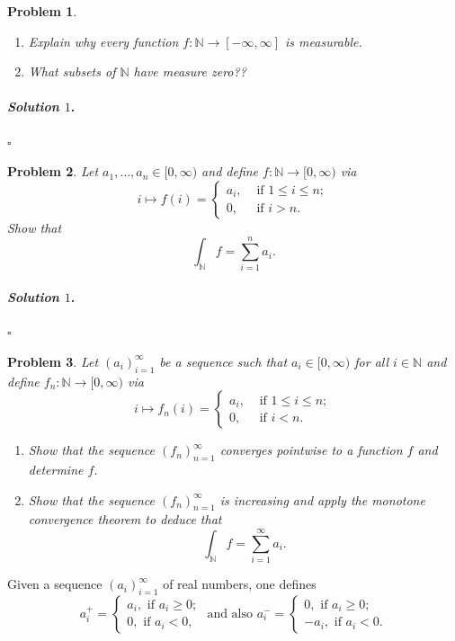 \documentclass[reqno]{amsart}
\theoremstyle{plain}
\newtheorem{problem}{Problem}
\theoremstyle{definition}
\newenvironment{solution1}{\paragraph{\emph{Solution $1$}.}}{\hfill$\square$}
\begin{document}
\begin{problem}
\hfill
\begin{enumerate}
\item Explain why every function $f:\mathbb{N} \rightarrow [-\infty,\infty]$ is measurable.
\item What subsets of $\mathbb{N}$ have measure zero??
\end{enumerate}
\end{problem}
\begin{solution1}

\end{solution1}

\begin{problem}
Let $a_{1},\ldots,a_{n} \in [0,\infty)$ and define $f:\mathbb{N} \rightarrow [0,\infty)$ via
$$i \mapsto f(i) = \begin{cases} a_{i}, &\text{ if } 1 \le i \le n;\\ 0, &\text{ if } i > n.  \end{cases} $$
Show that
$$\int_{\mathbb{N}}f = \sum_{i=1}^{n}a_{i}. $$
\end{problem}
\begin{solution1}

\end{solution1}

\begin{problem}
Let $(a_{i})_{i=1}^{\infty}$ be a sequence such that $a_{i} \in [0,\infty)$ for all $i \in \mathbb{N}$ and define $f_{n}:\mathbb{N} \rightarrow [0,\infty)$ via
$$i \mapsto f_{n}(i) = \begin{cases} a_{i}, & \text{ if } 1 \le i \le n;\\0, & \text{ if } i < n. \end{cases} $$
\begin{enumerate}
\item Show that the sequence $(f_{n})_{n=1}^{\infty}$ converges pointwise to a function $f$ and determine $f$.
\item Show that the sequence $(f_{n})_{n=1}^{\infty}$ is increasing and apply the monotone convergence theorem to deduce that
$$\int_{\mathbb{N}} f = \sum_{i=1}^{\infty}a_{i}. $$
\end{enumerate}
\end{problem}

Given a sequence $(a_{i})_{i=1}^{\infty}$ of real numbers, one defines
$$a_{i}^{+} = \begin{cases} a_{i}, \text{ if } a_{i} \ge 0; \\ 0, \text{ if } a_{i} < 0, \end{cases} \text{ and also } a_{i}^{-} = \begin{cases} 0, \text{ if } a_{i} \ge 0; \\ -a_{i}, \text{ if } a_{i} < 0. \end{cases} $$
\end{document}
